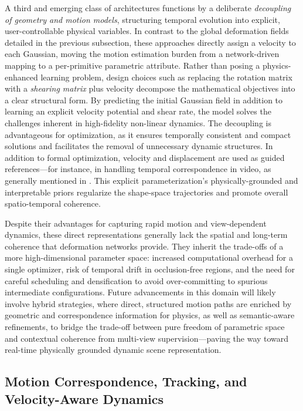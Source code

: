 \documentclass[11pt,a4paper]{article}
\begin{document}
A third and emerging class of architectures functions by a deliberate \emph{decoupling of geometry and motion models}, structuring temporal evolution into explicit, user-controllable physical variables. In contrast to the global deformation fields detailed in the previous subsection, these approaches directly assign a velocity to each Gaussian, moving the motion estimation burden from a network-driven mapping to a per-primitive parametric attribute. Rather than posing a physics-enhanced learning problem, design choices such as replacing the rotation matrix with a \emph{shearing matrix} plus velocity decompose the mathematical objectives into a clear structural form. By predicting the initial Gaussian field in addition to learning an explicit velocity potential and shear rate, the model solves the challenges inherent in high-fidelity non-linear dynamics. The decoupling is advantageous for optimization, as it ensures temporally consistent and compact solutions and facilitates the removal of unnecessary dynamic structures. In addition to formal optimization, velocity and displacement are used as guided references---for instance, in handling temporal correspondence in video, as generally mentioned in \cite{arxiv:2606.23212v1}. This explicit parameterization's physically-grounded and interpretable priors regularize the shape-space trajectories and promote overall spatio-temporal coherence.

Despite their advantages for capturing rapid motion and view-dependent dynamics, these direct representations generally lack the spatial and long-term coherence that deformation networks provide. They inherit the trade-offs of a more high-dimensional parameter space: increased computational overhead for a single optimizer, risk of temporal drift in occlusion-free regions, and the need for careful scheduling and densification to avoid over-committing to spurious intermediate configurations. Future advancements in this domain will likely involve hybrid strategies, where direct, structured motion paths are enriched by geometric and correspondence information for physics, as well as semantic-aware refinements, to bridge the trade-off between pure freedom of parametric space and contextual coherence from multi-view supervision---paving the way toward real-time physically grounded dynamic scene representation.


\subsection{Motion Correspondence, Tracking, and Velocity-Aware Dynamics}
\end{document}

